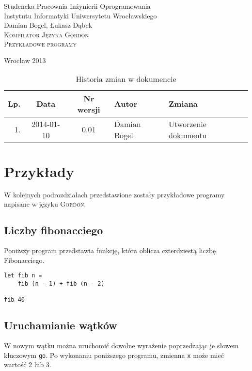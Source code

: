 \documentclass{documentation}
\begin{document}
\begin{titlepage}
\begin{center}
Studencka Pracownia Inżynierii Oprogramowania\\
Instytutu Informatyki Uniwersytetu Wrocławskiego\\[6cm]

Damian Bogel, Łukasz Dąbek\\[1cm]
\textsc{\LARGE Kompilator Języka Gordon}\\[0.5cm]
\textsc{\large Przykładowe programy}

\vfill
Wrocław 2013 \\[2.5cm]

\end{center}
\end{titlepage}

\newpage
\begin{table}
	\centering
    \captionsetup{name=Tabela}
	\caption{Historia zmian w dokumencie}
		\begin{tabular}{|r|c|c|l|l|}
		\hline
		Lp.  & Data       & Nr wersji & Autor                 & Zmiana \\ \hline
		1.   & 2014-01-10 & 0.01 & Damian Bogel & Utworzenie dokumentu \\ \hline
	\end{tabular}
\end{table}
\newpage

\tableofcontents
\setcounter{page}{2}

\newpage

\section{Przykłady}
\noindent W kolejnych podrozdziałach przedstawione zostały przykładowe programy
napisane w języku \textsc{Gordon}.

\subsection{Liczby fibonacciego}
\noindent Poniższy program przedstawia funkcję, która oblicza czterdziestą
liczbę Fibonacciego.

\begin{verbatim}
let fib n = 
    fib (n - 1) + fib (n - 2)

fib 40
\end{verbatim}

\subsection{Uruchamianie wątków}
\noindent W nowym wątku można uruchomić dowolne wyrażenie poprzedzając je słowem kluczowym
\texttt{go}. Po wykonaniu poniższego programu, zmienna \texttt{x} może mieć wartość 2 lub 3.
\end{document}
